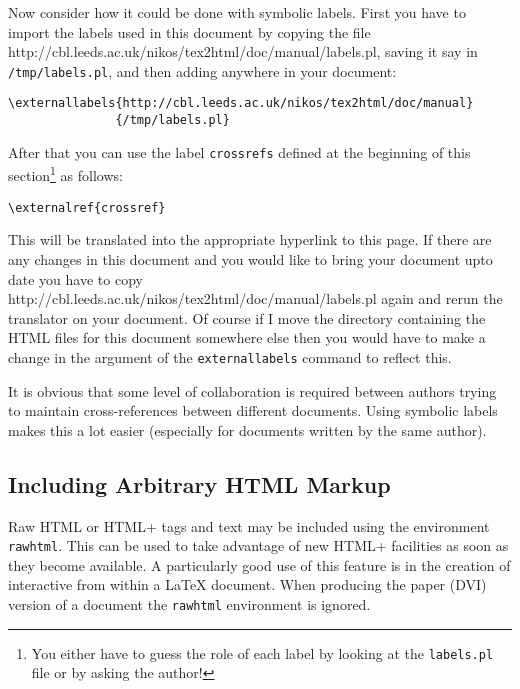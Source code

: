 Now consider how it could be done with symbolic labels. 
First you have to import the labels used in this document 
by copying the file 
{http://cbl.leeds.ac.uk/nikos/tex2html/doc/manual/labels.pl},
saving it say
in {\tt /tmp/labels.pl},
and then adding anywhere in your document:
\begin{verbatim}
\externallabels{http://cbl.leeds.ac.uk/nikos/tex2html/doc/manual}
               {/tmp/labels.pl}
\end{verbatim}
After that you can use the label {\tt crossrefs} defined at the beginning of this 
section\footnote{You either have to guess the role of each label by
looking at the {\tt labels.pl} file or by asking the author!} as follows:
\begin{verbatim}
\externalref{crossref}
\end{verbatim}
This will be translated into the appropriate hyperlink to this page.
If there are any changes in this document and you would like to
bring your document upto date you have to copy 
{http://cbl.leeds.ac.uk/nikos/tex2html/doc/manual/labels.pl} again
and rerun the translator on your document. Of course if I move the 
directory containing the HTML files for this document somewhere else 
then you would have to make a change in the argument of the 
{\tt externallabels} command to reflect this. 

It is obvious that some level of collaboration is required between
authors
trying to maintain cross-references between different documents. 
Using symbolic labels makes this a lot easier (especially for documents
written by the same author).

\subsection{Including Arbitrary HTML Markup}
Raw HTML or HTML+ tags and text may be included using the environment {\tt
rawhtml}. This can be used to take advantage
of new HTML+ facilities as soon as they become available.
 A particularly
good use of this feature is in the creation of interactive
from within a LaTeX document. When producing the paper (DVI) version
of a document the {\tt rawhtml} environment is ignored.

